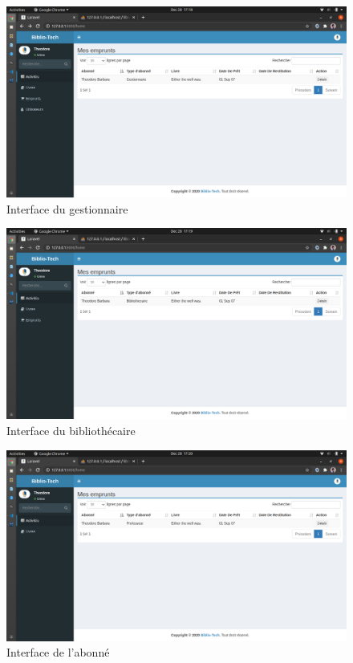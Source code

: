 \begin{figure}[h]
    \centering
    \includegraphics[width=1\textwidth]{interface_gestionnaire}
    \caption{Interface du gestionnaire}
    \label{image-interface_gestionnaire}
\end{figure}

\begin{figure}[h]
    \centering
    \includegraphics[width=1\textwidth]{interface_bibliothecaire}
    \caption{Interface du bibliothécaire}
    \label{image-interface_bibliothecaire}
\end{figure}

\begin{figure}[h]
    \centering
    \includegraphics[width=1\textwidth]{interface_abonne}
    \caption{Interface de l'abonné}
    \label{image-interface_abonne}
\end{figure}

